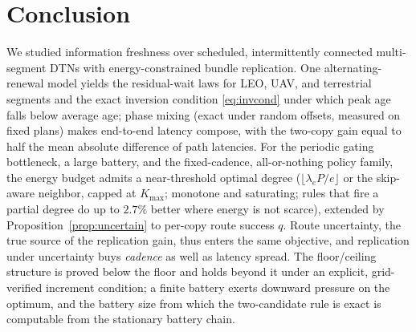 \documentclass[twocolumn,3p,times,procedia]{elsarticle}
\theoremstyle{plain}
\theoremstyle{remark}
\begin{document}
\FloatBarrier
\section{Conclusion}
We studied information freshness over scheduled, intermittently
connected multi-segment DTNs with energy-constrained bundle
replication. One alternating-renewal model yields the residual-wait
laws for LEO, UAV, and terrestrial segments and the exact inversion
condition \eqref{eq:invcond} under which peak age falls below average
age; phase mixing (exact under random offsets, measured on fixed
plans) makes end-to-end latency compose, with the two-copy gain equal
to half the mean absolute difference of path latencies. For the periodic
gating bottleneck, a large battery, and the fixed-cadence,
all-or-nothing policy family, the energy budget admits a
near-threshold optimal degree
($\lfloor\lambda_e P/e\rfloor$ or the skip-aware neighbor, capped at
$K_{\max}$; monotone and saturating; rules that fire a partial degree
do up to $2.7\%$ better where energy is not scarce), extended by
Proposition~\ref{prop:uncertain} to per-copy route success $q$. Route
uncertainty, the true source of the replication gain, thus enters the
same objective, and replication under uncertainty buys \emph{cadence}
as well as latency spread. The floor/ceiling structure is
proved below the floor and holds beyond it under an explicit,
grid-verified increment condition; a finite battery exerts downward
pressure on the optimum, and the battery size from which the
two-candidate rule is exact is computable from the stationary battery
chain.
\end{document}
